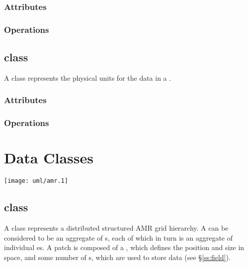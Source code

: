 \subsection{Attributes}

\subsection{Operations}

\section{ class}

A  class represents the physical units for the data in a
.

\subsection{Attributes}

\subsection{Operations}

\newpage

\chapter{Data Classes} \label{s:data-classes}

\centerline{\texttt{[image: uml/amr.1]}}

\section{ class}

A  class represents a distributed structured AMR grid
hierarchy.  A  can be considered to be an aggregate of
s, each of which in turn is an aggregate of individual
es.  A patch is composed of a , which defines
the position and size in space, and some number of s, which
are used to store  data (see \S\ref{ss:field}).



